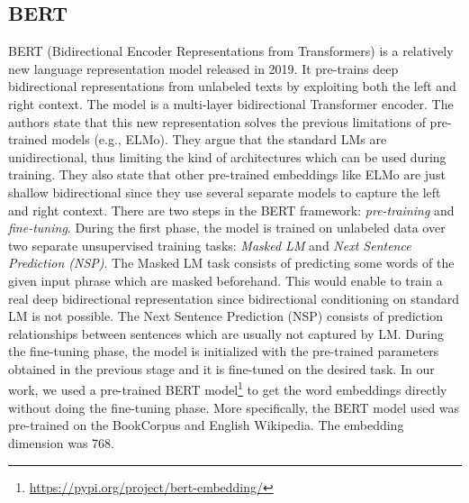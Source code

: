 \documentclass[11pt,a4paper]{article}
\begin{document}
\subsection{BERT}

BERT (Bidirectional Encoder Representations from Transformers) \cite{devlin2018bert} is a relatively new language representation model released in 2019. It pre-trains deep bidirectional representations from unlabeled texts by exploiting both the left and right context. The model is a multi-layer bidirectional Transformer encoder. The authors state that this new representation solves the previous limitations of pre-trained models (e.g., ELMo). They argue that the standard LMs are unidirectional, thus limiting the kind of architectures which can be used during training. They also state that other pre-trained embeddings like ELMo are just shallow bidirectional since they use several separate models to capture the left and right context.
There are two steps in the BERT framework: \textit{pre-training} and \textit{fine-tuning}. During the first phase, the model is trained on unlabeled data over two separate unsupervised training tasks: \textit{Masked LM} and \textit{Next Sentence Prediction (NSP)}.  The Masked LM task consists of predicting some words of the given input phrase which are masked beforehand.  This would enable to train a real deep bidirectional representation since bidirectional conditioning on standard LM is not possible. The Next Sentence Prediction (NSP) consists of prediction relationships between sentences which are usually not captured by LM. 
During the fine-tuning phase, the model is initialized with the pre-trained parameters obtained in the previous stage and it is fine-tuned on the desired task. 
In our work, we used a pre-trained BERT model\footnote{\url{https://pypi.org/project/bert-embedding/}} to get the word embeddings directly without doing the fine-tuning phase. More specifically, the BERT model used was pre-trained on the BookCorpus \cite{moviebook} and English Wikipedia. The embedding dimension was 768.  
\end{document}

